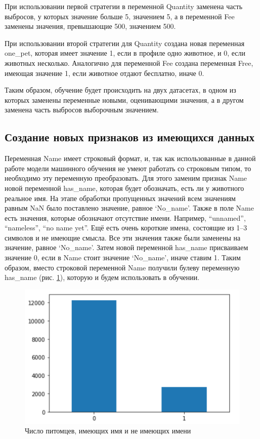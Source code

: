 \documentclass[14pt]{mmcs_article}
\begin{document}
При использовании первой стратегии в переменной Quantity заменена часть выбросов, у которых значение больше 5, значением 5, а в переменной Fee заменены значения, превышающие 500, значением 500.

При использовании второй стратегии для Quantity создана новая переменная one\_pet, которая имеет значение 1, если в профиле одно животное, и 0, если животных несколько. Аналогично для переменной Fee создана переменная Free, имеющая значение 1, если животное отдают бесплатно, иначе 0.

Таким образом, обучение будет происходить на двух датасетах, в одном из которых заменены переменные новыми, оценивающими значения, а в другом заменена часть выбросов выборочным значением.


\subsection{Создание новых признаков из имеющихся данных}

Переменная Name имеет строковый формат, и, так как использованные в данной работе модели машинного обучения не умеют работать со строковым типом, то необходимо эту переменную преобразовать. Для этого заменим признак Name новой переменной has\_name, которая будет обозначать, есть ли у животного реальное имя. На этапе обработки пропущенных значений всем значениям равным NaN было поставлено значение, равное `No\_name'. Также в поле Name есть значения, которые обозначают отсутствие имени. Например, ``unnamed'', ``nameless'', ``no name yet''. Ещё есть очень короткие имена, состоящие из 1–3 символов и не имеющие смысла. Все эти значения также были заменены на значение, равное `No\_name'. Затем новой переменной has\_name присваиваем значение 0, если в Name стоит значение `No\_name', иначе ставим 1. Таким образом, вместо строковой переменной Name получили булеву переменную has\_name (рис. \ref{analyse:hasname}), которую и будем использовать в обучении.

\begin{figure}[H]
	\centering
	\includegraphics[scale=1]{hasname.png}
	\caption{Число питомцев, имеющих имя и не имеющих имени}\label{analyse:hasname}
\end{figure}
\end{document}
